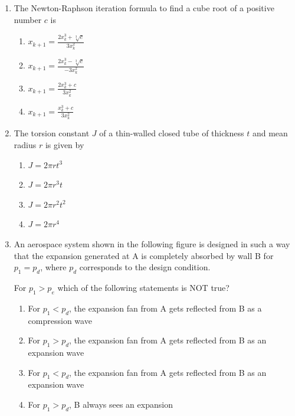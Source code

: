 \documentclass{article}
\begin{document}
\begin{enumerate}
    \item The Newton-Raphson iteration formula to find a cube root of a positive number $c$ is
    \begin{enumerate}
        \item $x_{k+1} = \frac{2 x_k^3 + \sqrt[3]{c}}{3 x_k^2}$
        \item $x_{k+1} = \frac{2 x_k^3 - \sqrt[3]{c}}{-3 x_k^2}$
        \item $x_{k+1} = \frac{2 x_k^3 + c}{3 x_k^2}$
        \item $x_{k+1} = \frac{x_k^3 + c}{3 x_k^2}$
    \end{enumerate}

    \item The torsion constant $J$ of a thin-walled closed tube of thickness $t$ and mean radius $r$ is given by
    \begin{multicols}{4}
    \begin{enumerate}
        \item $J = 2 \pi r t^3$
        \item $J = 2 \pi r^3 t$
        \item $J = 2 \pi r^2 t^2$
        \item $J = 2 \pi r^4$
    \end{enumerate}
    \end{multicols}
    

    \item An aerospace system shown in the following figure is designed in such a way that the expansion generated at A is completely absorbed by wall B for $p_1 = p_d$, where $p_d$ corresponds to the design condition.

    \begin{figure}[H]
        \centering
        
        \caption{}
        \label{fig:q67}
    \end{figure}
    
    For $p_1 > p_e$ which of the following statements is NOT true?
    \begin{enumerate}
        \item For $p_1 < p_d$, the expansion fan from A gets reflected from B as a compression wave
        \item For $p_1 > p_d$, the expansion fan from A gets reflected from B as an expansion wave
        \item For $p_1 < p_d$, the expansion fan from A gets reflected from B as an expansion wave
        \item For $p_1 > p_d$, B always sees an expansion
    \end{enumerate}


\end{enumerate}
\end{document}
